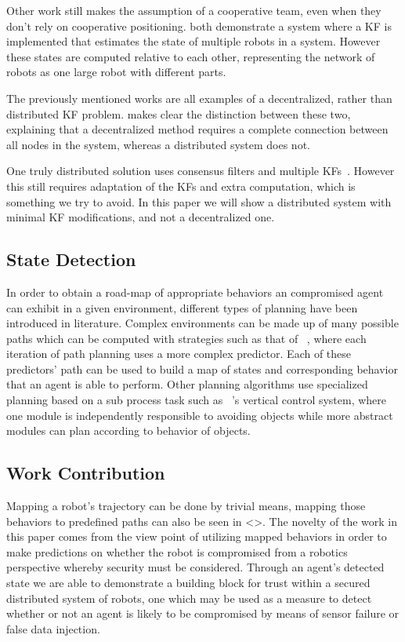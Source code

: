\documentclass[conference]{IEEEtran}
\begin{document}
Other work still makes the assumption of a cooperative team, even when they don't rely on cooperative positioning. \textcite{Sanderson1997, Roumeliotis2002} both demonstrate a system where a KF is implemented that estimates the state of multiple robots in a system. However these states are computed relative to each other, representing the network of robots as one large robot with different parts.

The previously mentioned works are all examples of a decentralized, rather than distributed KF problem. \textcite{Olfati-Saber2005} makes clear the distinction between these two, explaining that a decentralized method requires a complete connection between all nodes in the system, whereas a distributed system does not.

One truly distributed solution uses consensus filters and multiple KFs~\cite{Olfati-Saber2005}. However this still requires adaptation of the KFs and extra computation, which is something we try to avoid. In this paper we will show a distributed system with minimal KF modifications, and not a decentralized one. 

\subsection{State Detection}

In order to obtain a road-map of appropriate behaviors an compromised agent can exhibit in a given environment, different types of planning have been introduced in literature. Complex environments can be made up of many possible paths which can be computed with strategies such as that of ~\textcite{tallavajhula2016list}, where each iteration of path planning uses a more complex predictor. Each of these predictors' path can be used to build a map of states and corresponding behavior that an agent is able to perform. Other planning algorithms use specialized planning based on a sub process task such as ~\textcite{ahn2008robust}'s vertical control system, where one module is independently responsible to avoiding objects while more abstract modules can plan according to behavior of objects.

\subsection{Work Contribution}
Mapping a robot's trajectory can be done by trivial means, mapping those behaviors to predefined paths can also be seen in <>. The novelty of the work in this paper comes from the view point of utilizing mapped behaviors in order to make predictions on whether the robot is compromised from a robotics perspective whereby security must be considered. Through an agent's detected state we are able to demonstrate a building block for trust within a secured distributed system of robots, one which may be used as a measure to detect whether or not an agent is likely to be compromised by means of sensor failure or false data injection.
\end{document}
